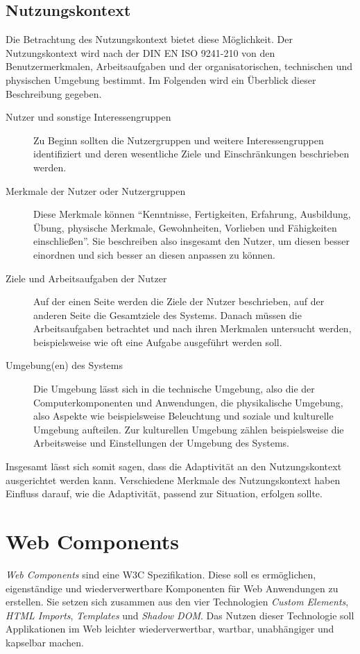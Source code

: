 \documentclass[12pt, paper=a4, bibtotoc, toc=listof, headsepline=true]{scrreprt}
\begin{document}
	\section{Nutzungskontext}
	Die Betrachtung des Nutzungskontext bietet diese Möglichkeit. Der Nutzungskontext wird nach der DIN EN ISO 9241-210 von den Benutzermerkmalen, Arbeitsaufgaben und der organisatorischen, technischen und physischen Umgebung bestimmt. Im Folgenden wird ein Überblick dieser Beschreibung gegeben\cite[S.15 ff.]{hoffmann2014venus}.
	\begin{description}  
		\item  [Nutzer und sonstige Interessengruppen] 
		Zu Beginn sollten die Nutzergruppen und weitere Interessengruppen identifiziert und deren wesentliche Ziele und Einschränkungen beschrieben werden.
			
		\item [Merkmale der Nutzer oder Nutzergruppen]
		Diese Merkmale können \enquote{Kenntnisse, Fertigkeiten, Erfahrung, Ausbildung, Übung, physische Merkmale, Gewohnheiten, Vorlieben und Fähigkeiten einschließen}\cite[S.16 ]{hoffmann2014venus}. Sie beschreiben also insgesamt den Nutzer, um diesen besser einordnen und sich besser an diesen anpassen zu können.
		
		\item  [Ziele und Arbeitsaufgaben der Nutzer]
		Auf der einen Seite werden die Ziele der Nutzer beschrieben, auf der anderen Seite die Gesamtziele des Systems. Danach müssen die Arbeitsaufgaben betrachtet und nach ihren Merkmalen untersucht werden, beispielsweise wie oft eine Aufgabe ausgeführt werden soll.
			
		\item [Umgebung(en) des Systems]
		Die Umgebung lässt sich in die technische Umgebung, also die der Computerkomponenten und Anwendungen, die physikalische Umgebung, also Aspekte wie beispielsweise Beleuchtung und soziale und kulturelle Umgebung aufteilen. Zur kulturellen Umgebung zählen beispielsweise die Arbeitsweise und Einstellungen der Umgebung des Systems.
	\end{description}
	Insgesamt lässt sich somit sagen, dass die Adaptivität an den Nutzungskontext ausgerichtet werden kann. Verschiedene Merkmale des Nutzungskontext haben Einfluss darauf, wie die Adaptivität, passend zur Situation, erfolgen sollte.
		
\chapter{Web Components}
	\emph{Web Components} sind eine \ac{W3C} Spezifikation. Diese soll es ermöglichen, eigenständige und wiederverwertbare Komponenten für Web Anwendungen zu erstellen\cite[S. 1]{patel2015learning}. Sie setzen sich zusammen aus den vier Technologien \emph{Custom Elements}, \emph{\ac{HTML} Imports}, \emph{Templates} und \emph{Shadow \ac{DOM}}. Das Nutzen dieser Technologie soll Applikationen im Web leichter wiederverwertbar, wartbar, unabhängiger und kapselbar machen\cite[S.2]{patel2015learning}.
\end{document}
